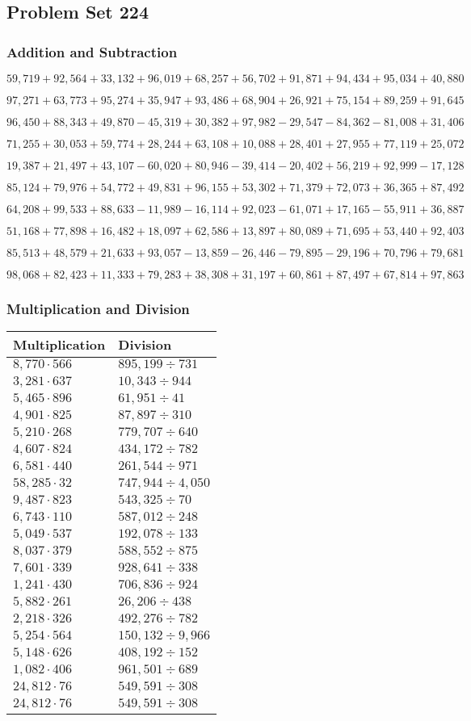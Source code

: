 \hypertarget{problem-set-224}{%
\subsection{Problem Set 224}\label{problem-set-224}}

\hypertarget{addition-and-subtraction}{%
\subsubsection{Addition and
Subtraction}\label{addition-and-subtraction}}

\(59,719+92,564+33,132+96,019+68,257+56,702+91,871+94,434+95,034+40,880\)

\(97,271+63,773+95,274+35,947+93,486+68,904+26,921+75,154+89,259+91,645\)

\(96,450+88,343+49,870-45,319+30,382+97,982-29,547-84,362-81,008+31,406\)

\(71,255+30,053+59,774+28,244+63,108+10,088+28,401+27,955+77,119+25,072\)

\(19,387+21,497+43,107-60,020+80,946-39,414-20,402+56,219+92,999-17,128\)

\(85,124+79,976+54,772+49,831+96,155+53,302+71,379+72,073+36,365+87,492\)

\(64,208+99,533+88,633-11,989-16,114+92,023-61,071+17,165-55,911+36,887\)

\(51,168+77,898+16,482+18,097+62,586+13,897+80,089+71,695+53,440+92,403\)

\(85,513+48,579+21,633+93,057-13,859-26,446-79,895-29,196+70,796+79,681\)

\(98,068+82,423+11,333+79,283+38,308+31,197+60,861+87,497+67,814+97,863\)

\hypertarget{multiplication-and-division}{%
\subsubsection{Multiplication and
Division}\label{multiplication-and-division}}

\begin{longtable}[]{@{}ll@{}}
\toprule
Multiplication & Division\tabularnewline
\midrule
\endhead
\(8,770\cdot566\) & \(895,199÷731\)\tabularnewline
\(3,281\cdot637\) & \(10,343÷944\)\tabularnewline
\(5,465\cdot896\) & \(61,951÷41\)\tabularnewline
\(4,901\cdot825\) & \(87,897÷310\)\tabularnewline
\(5,210\cdot268\) & \(779,707÷640\)\tabularnewline
\(4,607\cdot824\) & \(434,172÷782\)\tabularnewline
\(6,581\cdot440\) & \(261,544÷971\)\tabularnewline
\(58,285\cdot32\) & \(747,944÷4,050\)\tabularnewline
\(9,487\cdot823\) & \(543,325÷70\)\tabularnewline
\(6,743\cdot110\) & \(587,012÷248\)\tabularnewline
\(5,049\cdot537\) & \(192,078÷133\)\tabularnewline
\(8,037\cdot379\) & \(588,552÷875\)\tabularnewline
\(7,601\cdot339\) & \(928,641÷338\)\tabularnewline
\(1,241\cdot430\) & \(706,836÷924\)\tabularnewline
\(5,882\cdot261\) & \(26,206÷438\)\tabularnewline
\(2,218\cdot326\) & \(492,276÷782\)\tabularnewline
\(5,254\cdot564\) & \(150,132÷9,966\)\tabularnewline
\(5,148\cdot626\) & \(408,192÷152\)\tabularnewline
\(1,082\cdot406\) & \(961,501÷689\)\tabularnewline
\(24,812\cdot76\) & \(549,591÷308\)\tabularnewline
\(24,812\cdot76\) & \(549,591÷308\)\tabularnewline
\bottomrule
\end{longtable}
